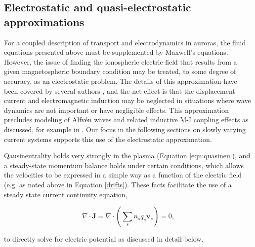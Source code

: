\documentclass[11pt,letterpaper]{article}
\begin{document}
\subsection{Electrostatic and quasi-electrostatic approximations} \label{EM}

For a coupled description of transport and electrodynamics in auroras, the fluid equations presented above must be supplemented by Maxwell's equations.  However, the issue of finding the ionospheric electric field that results from a given magnetospheric boundary condition may be treated, to some degree of accuracy, as an electrostatic problem.  The details of this approximation have been covered by several authors \citep[e.g.][and references therein]{Stmaurice:1996}, and the net effect is that the displacement current and electromagnetic induction may be neglected in situations where wave dynamics are not important or have negligible effects.  This approximation precludes modeling of Alfv\'en waves and related inductive M-I coupling effects as discussed, for example in \citet{Lotko:2004}.  Our focus in the following sections on slowly varying current systems supports this use of the electrostatic approximation.  %

Qausineutrality holds very strongly in the plasma (Equation \ref{eqn:quasineu}), and a steady-state momentum balance holds under certain conditions, which allows the velocities to be expressed in a simple way as a function of the electric field (e.g. as noted above in Equation \ref{drifts}).  These facts facilitate the use of a steady state current continuity equation,
\begin{linenomath*} \begin{equation}
\nabla \cdot \mathbf{J} = \nabla \cdot \left( \sum_s n_s q_s \mathbf{v}_s \right)  = 0, \label{divJSS} 
\end{equation} \end{linenomath*}
to directly solve for electric potential as discussed in detail below.
\end{document}
